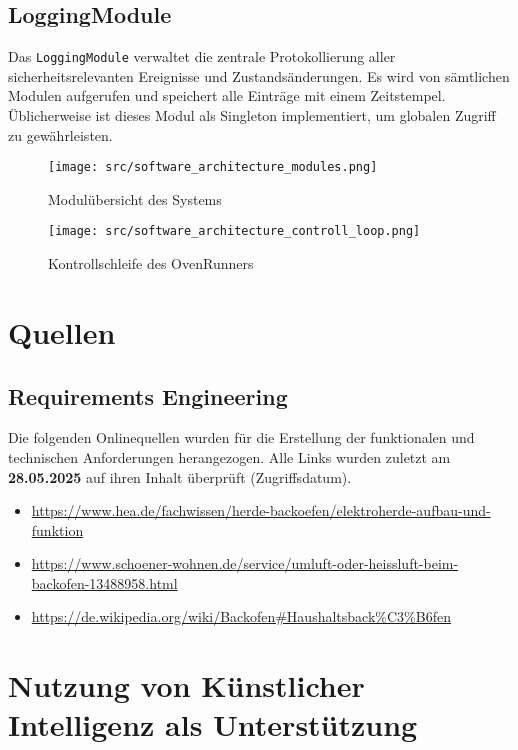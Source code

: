 \documentclass[a4paper,12pt]{article}
\begin{document}
\subsection*{LoggingModule}
Das \texttt{LoggingModule} verwaltet die zentrale Protokollierung aller sicherheitsrelevanten Ereignisse und Zustandsänderungen. Es wird von sämtlichen Modulen aufgerufen und speichert alle Einträge mit einem Zeitstempel. Üblicherweise ist dieses Modul als Singleton implementiert, um globalen Zugriff zu gewährleisten.

\clearpage

\begin{figure}[h!]
  \centering
  \texttt{[image: src/software\_architecture\_modules.png]}
  \caption{Modulübersicht des Systems}
  \label{fig:moduluebersicht}
\end{figure}

\begin{figure}[h!]
  \centering
  \texttt{[image: src/software\_architecture\_controll\_loop.png]}
  \caption{Kontrollschleife des OvenRunners}
  \label{fig:controllloop}
\end{figure}

\clearpage


\section*{Quellen}

\subsection*{Requirements Engineering}

Die folgenden Onlinequellen wurden für die Erstellung der funktionalen und technischen Anforderungen herangezogen. Alle Links wurden zuletzt am \textbf{28.05.2025} auf ihren Inhalt überprüft (Zugriffsdatum).

\begin{itemize}
    \item \url{https://www.hea.de/fachwissen/herde-backoefen/elektroherde-aufbau-und-funktion}
    \item \url{https://www.schoener-wohnen.de/service/umluft-oder-heissluft-beim-backofen-13488958.html}
    \item \url{https://de.wikipedia.org/wiki/Backofen#Haushaltsback%C3%B6fen}
\end{itemize}

\newpage

\section*{Nutzung von Künstlicher Intelligenz als Unterstützung}
\end{document}
